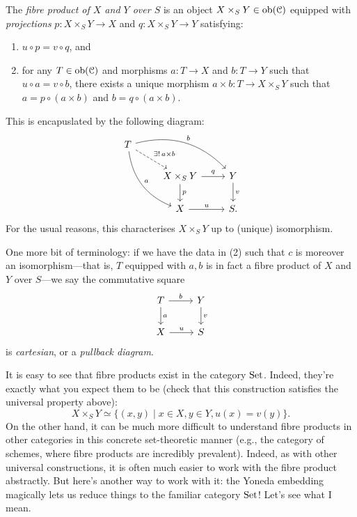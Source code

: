 \begin{definition}
The \textit{fibre product of $X$ and $Y$ over $S$} is an object $X
\times_S Y \in \operatorname{ob}(\mathcal{C})$ equipped with \textit{projections} $p : X
\times_S Y \to X$ and $q : X \times_S Y \to Y$ satisfying:
\begin{enumerate}
\item $u \circ p = v \circ q$, and
\item for any $T \in \operatorname{ob}(\mathcal{C})$ and morphisms $a : T \to X$ and $b : T
  \to Y$ such that $u \circ a = v \circ b$, there exists a unique
  morphism $a \times b : T \to X \times_S Y$ such that $a = p \circ (a
  \times b)$ and $b = q \circ (a \times b)$.
\end{enumerate}
This is encapuslated by the following diagram:
\[
\begin{tikzcd}
  T \ar[bend left]{rrd}{b} \ar[bend right]{ddr}{a}
  \ar[dashed]{dr}{\exists!\, a \times b} & & \\ & X \times_S Y \rar{q}
  \dar{p} & Y \dar{v} \\ & X \rar{u} & S.
\end{tikzcd}
\]
For the usual reasons, this characterises $X \times_S Y$ up to
(unique) isomorphism.

\medskip
One more bit of terminology: if we have the data in (2) such that $c$
is moreover an isomorphism---that is, $T$ equipped with $a,b$ is in
fact a fibre product of $X$ and $Y$ over $S$---we say the commutative
square
\[
\begin{tikzcd}
  T \rar{b} \dar{a} & Y \dar{v} \\ X \rar{u} & S
\end{tikzcd}
\]
is \textit{cartesian}, or a \textit{pullback diagram}.
\end{definition}

\begin{example}
  It is easy to see that fibre products exist in the category
  $\mathrm{Set}$. Indeed, they're exactly what you expect them to be (check
  that this construction satisfies the universal property above):
  \[
  X \times_S Y \simeq \{(x, y) \mid x \in X, y \in Y, u(x) = v(y)\}.
  \]
  On the other hand, it can be much more difficult to understand fibre
  products in other categories in this concrete set-theoretic manner
  (e.g., the category of schemes, where fibre products are incredibly
  prevalent). Indeed, as with other universal constructions, it is
  often much easier to work with the fibre product abstractly. But
  here's another way to work with it: the Yoneda embedding magically
  lets us reduce things to the familiar category $\mathrm{Set}$!  Let's see
  what I mean.
\end{example}

